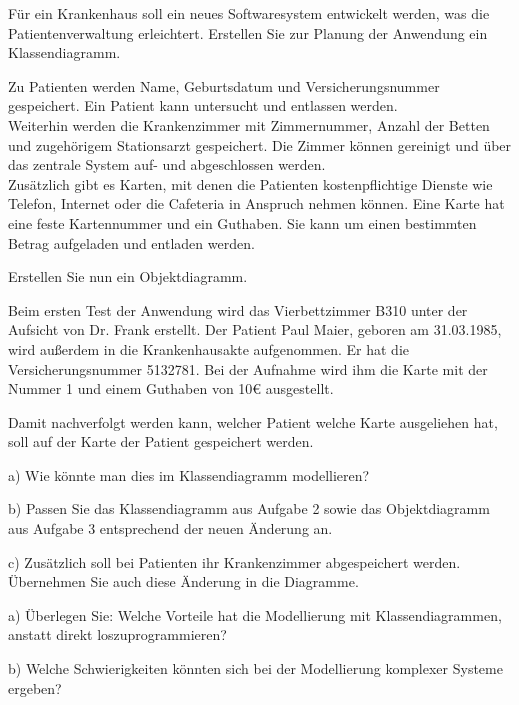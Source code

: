 \documentclass[11pt, a4paper, oneside]{article}
\begin{document}
	
	Für ein Krankenhaus soll ein neues Softwaresystem entwickelt werden, was die Patientenverwaltung erleichtert.
	Erstellen Sie zur Planung der Anwendung ein Klassendiagramm.
	
	Zu Patienten werden Name, Geburtsdatum und Versicherungsnummer gespeichert.
	Ein Patient kann untersucht und entlassen werden.\\
	Weiterhin werden die Krankenzimmer mit Zimmernummer, Anzahl der Betten und zugehörigem Stationsarzt gespeichert.
	Die Zimmer können gereinigt und über das zentrale System auf- und abgeschlossen werden.\\
	Zusätzlich gibt es Karten, mit denen die Patienten kostenpflichtige Dienste wie Telefon, Internet oder die Cafeteria in Anspruch nehmen können.
	Eine Karte hat eine feste Kartennummer und ein Guthaben.
	Sie kann um einen bestimmten Betrag aufgeladen und entladen werden.
	
	
	Erstellen Sie nun ein Objektdiagramm.
	
	Beim ersten Test der Anwendung wird das Vierbettzimmer B310 unter der Aufsicht von Dr. Frank erstellt.
	Der Patient Paul Maier, geboren am 31.03.1985, wird außerdem in die Krankenhausakte aufgenommen.
	Er hat die Versicherungsnummer 5132781.
	Bei der Aufnahme wird ihm die Karte mit der Nummer 1 und einem Guthaben von 10€ ausgestellt.
	
	\pagebreak
	
	Damit nachverfolgt werden kann, welcher Patient welche Karte ausgeliehen hat, soll auf der Karte der Patient gespeichert werden.
	
	a) Wie könnte man dies im Klassendiagramm modellieren?
	
	\lines[3cm]
	
	b) Passen Sie das Klassendiagramm aus Aufgabe 2 sowie das Objektdiagramm aus Aufgabe 3 entsprechend der neuen Änderung an.
	
	c) Zusätzlich soll bei Patienten ihr Krankenzimmer abgespeichert werden.
	Übernehmen Sie auch diese Änderung in die Diagramme.
	
	
	a) Überlegen Sie: Welche Vorteile hat die Modellierung mit Klassendiagrammen, anstatt direkt loszuprogrammieren?
	
	\lines[3cm]
	
	b) Welche Schwierigkeiten könnten sich bei der Modellierung komplexer Systeme ergeben?
	
	\lines[3cm]
	
\end{document}
